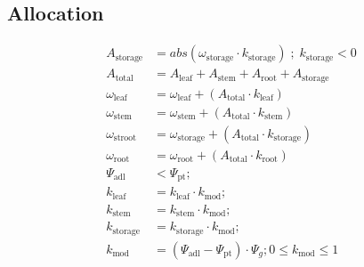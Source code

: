 \documentclass[12pt]{report}
\begin{document}
\subsection*{Allocation}
\begin{align}
 A_{\text{storage}} &= abs(\omega_{\text{storage}} \cdot k_{\text{storage}}) \; ; \; k_{\text{storage}}<0 \label{eqn:Astroot} \\
A_{\text{total}} &= A_{\text{leaf}} + A_{\text{stem}} + A_{\text{root}} + A_{\text{storage}}  \label{eqn:Atotal} \\
 \omega_{\text{leaf}} &= \omega_{\text{leaf}} + (A_{\text{total}} \cdot k_{\text{leaf}}) \label{eqn:omegaleaf} \\
 \omega_{\text{stem}} &= \omega_{\text{stem}} + (A_{\text{total}} \cdot k_{\text{stem}}) \label{eqn:omegastem} \\
 \omega_{\text{stroot}} &= \omega_{\text{storage}} + (A_{\text{total}} \cdot k_{\text{storage}})  \\
 \omega_{\text{root}} &= \omega_{\text{root}} + (A_{\text{total}} \cdot k_{\text{root}}) \label{eqn:omegaroot} \\
 \Psi_{\text{adl}} &< \Psi_{\text{pt}} ; \nonumber \\
 k_{\text{leaf}} &= k_{\text{leaf}} \cdot k_{\text{mod}} ; \nonumber \\
 k_{\text{stem}} &= k_{\text{stem}} \cdot k_{\text{mod}} ; \nonumber \\ 
 k_{\text{storage}} &= k_{\text{storage}} \cdot k_{\text{mod}} ; \nonumber \\ 
 k_{\text{mod}} &= (\Psi_{\text{adl}} - \Psi_{\text{pt}}) \cdot \Psi_g ; 0 \leq k_{\text{mod}} \leq 1 \label{eqn:kmod} \\

\end{align}
\end{document}
